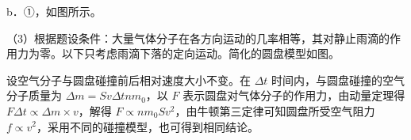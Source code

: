 \documentclass[\gkver]{gaokaozhenti}
\begin{document}
\begin{enumerate}
{b．①，如图所示。


（3）根据题设条件：大量气体分子在各方向运动的几率相等，其对静止雨滴的作用力为零。以下只考虑雨滴下落的定向运动。简化的圆盘模型如图。


设空气分子与圆盘碰撞前后相对速度大小不变。在 $\Delta t$ 时间内，与圆盘碰撞的空气分子质量为 $\Delta m=Sv\Delta tnm_0$，以 $F$ 表示圆盘对气体分子的作用力，由动量定理得 $F\Delta t\propto\Delta m\times v$，解得 $F\propto nm_0Sv^2$，由牛顿第三定律可知圆盘所受空气阻力 $f\propto v^2$，采用不同的碰撞模型，也可得到相同结论。
}

\end{enumerate}
\end{document}
